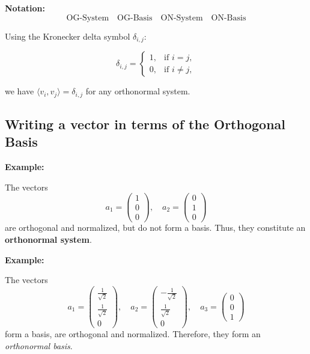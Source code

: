 \textbf{Notation:}
\[
\text{OG-System} \quad \text{OG-Basis} \quad \text{ON-System} \quad \text{ON-Basis}
\]

Using the Kronecker delta symbol \( \delta_{i,j} \):

\[
\delta_{i,j} =
\begin{cases}
1, & \text{if } i = j, \\
0, & \text{if } i \neq j,
\end{cases}
\]

we have \( \langle v_i, v_j \rangle = \delta_{i,j} \) for any orthonormal system.

\subsection{Writing a vector in terms of the Orthogonal Basis}

\textbf{Example:}
\vspace{\baselineskip} 

The vectors
\[
a_1 =
\begin{pmatrix}
1 \\
0 \\
0
\end{pmatrix}, \quad
a_2 =
\begin{pmatrix}
0 \\
1 \\
0
\end{pmatrix}
\]
are orthogonal and normalized, but do not form a basis. Thus, they constitute an \textbf{orthonormal system}.
\vspace{\baselineskip}

\textbf{Example:}
\vspace{\baselineskip}
 

The vectors
\[
a_1 =
\begin{pmatrix}
\frac{1}{\sqrt{2}} \\
\frac{1}{\sqrt{2}} \\
0
\end{pmatrix}, \quad
a_2 =
\begin{pmatrix}
-\frac{1}{\sqrt{2}} \\
\frac{1}{\sqrt{2}} \\
0
\end{pmatrix}, \quad
a_3 =
\begin{pmatrix}
0 \\
0 \\
1
\end{pmatrix}
\]
form a basis, are orthogonal and normalized. Therefore, they form an \emph{orthonormal basis}.

